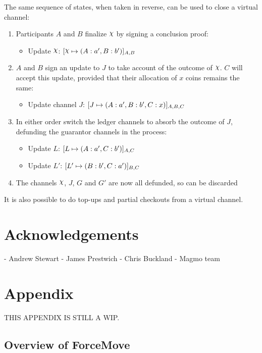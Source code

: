 \documentclass{article}
\begin{document}
The same sequence of states, when taken in reverse, can be used to close a virtual channel:
\begin{enumerate}
  \item Participants $A$ and $B$ finalize $\rchi$ by signing a conclusion proof:
  \begin{itemize}
    \item Update $\rchi$: $\finalizable{\rchi}{\alloc{A:a', B:b'}}{A,B}$
  \end{itemize}
  \item $A$ and $B$ sign an update to $J$ to take account of the outcome of $\rchi$. $C$ will accept this update, provided that their allocation of $x$ coins remains the same:
  \begin{itemize}
    \item Update channel $J$: $[J \mapsto ( A: a', B:b', C: x )]_{A, B, C}$
  \end{itemize}
  \item In either order switch the ledger channels to absorb the outcome of $J$, defunding the guarantor channels in the process:
  \begin{itemize}
    \item Update $L$: $[L \mapsto ( A: a', C: b' )]_{A,C}$
    \item Update $L'$: $[L' \mapsto ( B: b', C: a' )]_{B,C}$
  \end{itemize}
  \item The channels $\rchi$, $J$, $G$ and $G'$ are now all defunded, so can be discarded
\end{enumerate}

It is also possible to do top-ups and partial checkouts from a virtual channel.

\section{Acknowledgements}

- Andrew Stewart
- James Prestwich
- Chris Buckland
- Magmo team

\newpage

\section{Appendix}

THIS APPENDIX IS STILL A WIP.

\subsection{Overview of ForceMove}
\end{document}
